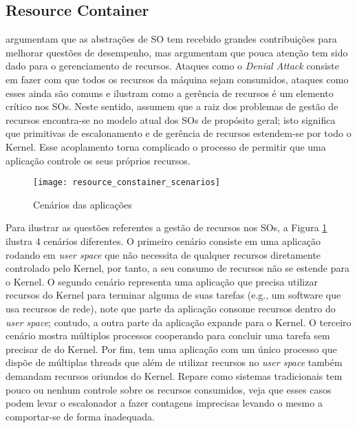 \subsection{Resource Container}

\cite{resourcecontainers} argumentam que as abstrações de SO tem recebido
grandes contribuições para melhorar questões de desempenho, mas argumentam que
pouca atenção tem sido dado para o gerenciamento de recursos. Ataques como o
\emph{Denial Attack} consiste em fazer com que todos os recursos da máquina
sejam consumidos, ataques como esses ainda são comuns e ilustram como a
gerência de recursos é um elemento crítico nos SOs. Neste sentido,
\cite{resourcecontainers} assumem que a raiz dos problemas de gestão de
recursos encontra-se no modelo atual dos SOs de propósito geral; isto significa
que primitivas de escalonamento e de gerência de recursos estendem-se por todo
o Kernel. Esse acoplamento torna complicado o processo de permitir que uma
aplicação controle os seus próprios recursos.

\begin{figure}[!h]
  \centering
  \texttt{[image: resource\_constainer\_scenarios]} 
  \caption{Cenários das aplicações}
  \label{fig:resource_constainer_scenarios}
\end{figure}

Para ilustrar as questões referentes a gestão de recursos nos SOs, a Figura
\ref{fig:resource_constainer_scenarios} ilustra 4 cenários diferentes. O
primeiro cenário consiste em uma aplicação rodando em \textit{user space} que
não necessita de qualquer recursos diretamente controlado pelo Kernel, por
tanto, a seu consumo de recursos não se estende para o Kernel. O segundo
cenário representa uma aplicação que precisa utilizar recursos do Kernel para
terminar alguma de suas tarefas (e.g., um software que usa recursos de rede),
note que parte da aplicação consome recursos dentro do \textit{user space};
contudo, a outra parte da aplicação expande para o Kernel. O terceiro cenário
mostra múltiplos processos cooperando para concluir uma tarefa sem precisar de
do Kernel. Por fim, tem uma aplicação com um único processo que dispõe de
múltiplas threads que além de utilizar recursos no \textit{user space} também
demandam recursos oriundos do Kernel. Repare como sistemas tradicionais tem
pouco ou nenhum controle sobre os recursos consumidos, veja que esses casos
podem levar o escalonador a fazer contagens imprecisas levando o mesmo a
comportar-se de forma inadequada.

